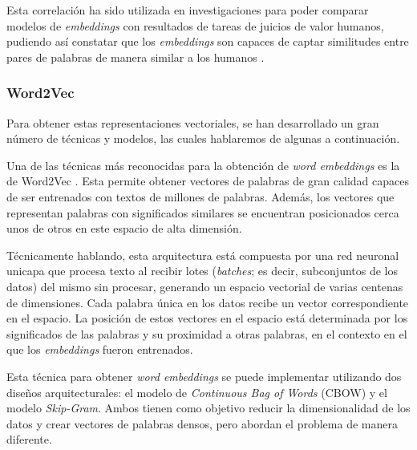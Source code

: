 Esta correlación ha sido utilizada en investigaciones para poder comparar modelos de \textit{embeddings} con resultados de tareas de juicios de valor humanos, pudiendo así constatar que los \textit{embeddings} son capaces de captar similitudes entre pares de palabras de manera similar a los humanos \parencite{chandrasekaran2021comparativeanalysiswordembeddings}.

\subsubsection{Word2Vec}

Para obtener estas representaciones vectoriales, se han desarrollado un gran número de técnicas y modelos, las cuales hablaremos de algunas a continuación.

Una de las técnicas más reconocidas para la obtención de \textit{word embeddings} es la de Word2Vec \parencite{mikolov2013efficientestimationwordrepresentations}. Esta permite obtener vectores de palabras de gran calidad capaces de ser entrenados con textos de millones de palabras. Además, los vectores que representan palabras con significados similares se encuentran posicionados cerca unos de otros en este espacio de alta dimensión.

Técnicamente hablando, esta arquitectura está compuesta por una red neuronal unicapa que procesa texto al recibir lotes (\textit{batches}; es decir, subconjuntos de los datos) del mismo sin procesar, generando un espacio vectorial de varias centenas de dimensiones. Cada palabra única en los datos recibe un vector correspondiente en el espacio. La posición de estos vectores en el espacio está determinada por los significados de las palabras y su proximidad a otras palabras, en el contexto en el que los \textit{embeddings} fueron entrenados.

Esta técnica para obtener \textit{word embeddings} se puede implementar utilizando dos diseños arquitecturales: el modelo de \textit{Continuous Bag of Words} (CBOW) y el modelo \textit{Skip-Gram}. Ambos tienen como objetivo reducir la dimensionalidad de los datos y crear vectores de palabras densos, pero abordan el problema de manera diferente.

